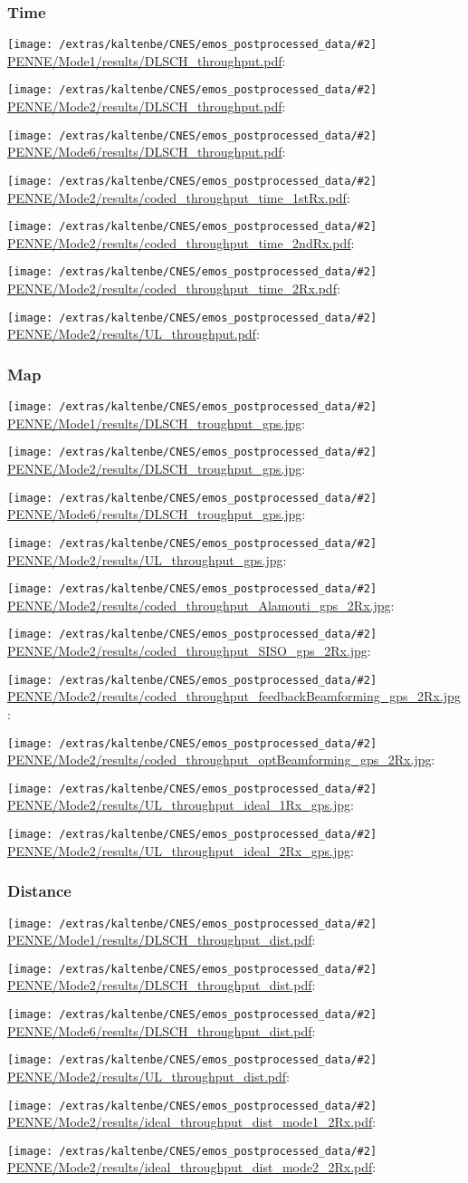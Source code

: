 \documentclass[a4paper,10pt]{article}
\newcommand{\printfile}[2][]{
 \begin{minipage}{8cm}
  \centering
  \texttt{[image: /extras/kaltenbe/CNES/emos\_postprocessed\_data/\#2]}
  \url{#2}: #1

 \end{minipage}
}
\begin{document}
\subsubsection{Time}

\printfile{PENNE/Mode1/results/DLSCH_throughput.pdf}
\printfile{PENNE/Mode2/results/DLSCH_throughput.pdf}

\printfile{PENNE/Mode6/results/DLSCH_throughput.pdf}
\printfile{PENNE/Mode2/results/coded_throughput_time_1stRx.pdf}

\printfile{PENNE/Mode2/results/coded_throughput_time_2ndRx.pdf}
\printfile{PENNE/Mode2/results/coded_throughput_time_2Rx.pdf}

\printfile{PENNE/Mode2/results/UL_throughput.pdf}


\subsubsection{Map}

\printfile{PENNE/Mode1/results/DLSCH_troughput_gps.jpg}
\printfile{PENNE/Mode2/results/DLSCH_troughput_gps.jpg}

\printfile{PENNE/Mode6/results/DLSCH_troughput_gps.jpg}
\printfile{PENNE/Mode2/results/UL_throughput_gps.jpg}

\printfile{PENNE/Mode2/results/coded_throughput_Alamouti_gps_2Rx.jpg}
\printfile{PENNE/Mode2/results/coded_throughput_SISO_gps_2Rx.jpg}

\printfile{PENNE/Mode2/results/coded_throughput_feedbackBeamforming_gps_2Rx.jpg}
\printfile{PENNE/Mode2/results/coded_throughput_optBeamforming_gps_2Rx.jpg}

\printfile{PENNE/Mode2/results/UL_throughput_ideal_1Rx_gps.jpg}
\printfile{PENNE/Mode2/results/UL_throughput_ideal_2Rx_gps.jpg}

\subsubsection{Distance}

\printfile{PENNE/Mode1/results/DLSCH_throughput_dist.pdf}
\printfile{PENNE/Mode2/results/DLSCH_throughput_dist.pdf}

\printfile{PENNE/Mode6/results/DLSCH_throughput_dist.pdf}
\printfile{PENNE/Mode2/results/UL_throughput_dist.pdf}


\printfile{PENNE/Mode2/results/ideal_throughput_dist_mode1_2Rx.pdf}
%
\printfile{PENNE/Mode2/results/ideal_throughput_dist_mode2_2Rx.pdf}
\end{document}
